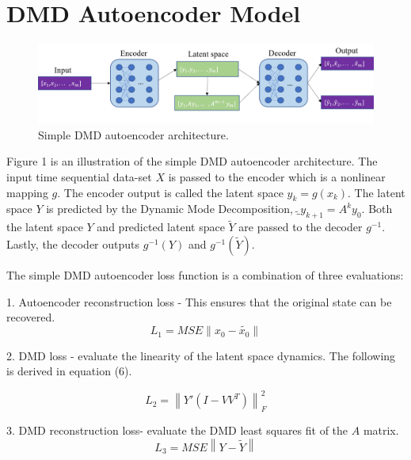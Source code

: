 \documentclass[twocolumn, letterpaper]{scrartcl}
\begin{document}
\section*{\fontsize{15}{15} \textbf{DMD Autoencoder Model}}
    \begin{figure}[H]
        \centering
        \vspace{-\intextsep}
        \includegraphics[width=\linewidth]{network_arc_pp_crop.PNG}
        \vspace{-8pt}
        \caption{Simple DMD autoencoder architecture. } 
    \end{figure}
    \vspace{-\intextsep}
    
    Figure 1 is an illustration of the simple DMD autoencoder architecture. The input time sequential data-set $X$ is passed to the encoder which is a nonlinear mapping $g$. The encoder output is called the latent space $y_{k} = g(x_{k})$. The latent space $Y$ is predicted by the Dynamic Mode Decomposition, $\tilde_{y_{k+1}} = A^{k}y_{0}$. Both the latent space $Y$ and predicted latent space $\tilde{Y}$ are passed to the decoder $g^{-1}$. Lastly, the decoder outputs $g^{-1}(Y)$ and $g^{-1}(\tilde{Y})$.
    
    The simple DMD autoencoder loss function is a combination of three evaluations: 
    
    1. Autoencoder reconstruction loss -  This ensures that the original state can be recovered.
    \begin{equation} \label{eq:8}
    L_{1} = MSE \left\| x_{0} - \tilde{x_{0}} \right\|
    \end{equation}
    
    2. DMD loss - evaluate the linearity of the latent space dynamics. The following is derived in equation (6).
    
    \begin{equation} \label{eq:9}
    L_{2} = \left\| Y' ( I - V V^{T}) \right\| _{F}^{2}
    \end{equation}
    
    
    3. DMD reconstruction loss- evaluate the DMD least squares fit of the $A$ matrix. 
    \begin{equation} \label{eq:10}
    L_{3} = MSE\left\| Y - \tilde{Y} \right\| 
    \end{equation}
    
\end{document}
